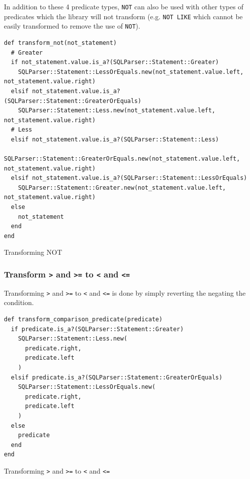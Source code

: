 In addition to these 4 predicate types, \texttt{NOT} can also be used with other types of predicates which the library will not transform (e.g. \texttt{NOT LIKE} which cannot be easily transformed to remove the use of \texttt{NOT}).

\begin{code}
\begin{verbatim}
def transform_not(not_statement)
  # Greater
  if not_statement.value.is_a?(SQLParser::Statement::Greater)
    SQLParser::Statement::LessOrEquals.new(not_statement.value.left, not_statement.value.right)
  elsif not_statement.value.is_a?(SQLParser::Statement::GreaterOrEquals)
    SQLParser::Statement::Less.new(not_statement.value.left, not_statement.value.right)
  # Less
  elsif not_statement.value.is_a?(SQLParser::Statement::Less)
    SQLParser::Statement::GreaterOrEquals.new(not_statement.value.left, not_statement.value.right)
  elsif not_statement.value.is_a?(SQLParser::Statement::LessOrEquals)
    SQLParser::Statement::Greater.new(not_statement.value.left, not_statement.value.right)
  else
    not_statement
  end
end
\end{verbatim}
\caption{Transforming NOT}
\label{fig:transforming_not}
\end{code}

\subsubsection{Transform \texttt{>} and \texttt{>=} to \texttt{<} and \texttt{<=}}

Transforming \texttt{>} and \texttt{>=} to \texttt{<} and \texttt{<=} is done by simply reverting the negating the condition.

\begin{code}
\begin{verbatim}
def transform_comparison_predicate(predicate)
  if predicate.is_a?(SQLParser::Statement::Greater)
    SQLParser::Statement::Less.new(
      predicate.right,
      predicate.left
    )
  elsif predicate.is_a?(SQLParser::Statement::GreaterOrEquals)
    SQLParser::Statement::LessOrEquals.new(
      predicate.right,
      predicate.left
    )
  else
    predicate
  end
end
\end{verbatim}
\caption{Transforming \texttt{>} and \texttt{>=} to \texttt{<} and \texttt{<=}}
\label{fig:transforming_great}
\end{code}

